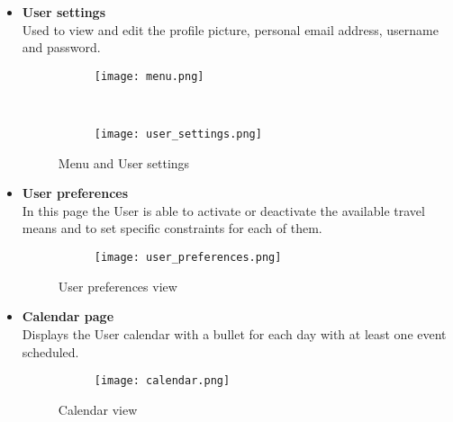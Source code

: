 \begin{itemize}
	\item \textbf{User settings}\\
	Used to view and edit the profile picture, personal email address, username and password.
	\begin{figure}[H]
	\centering
		\begin{subfigure}{0.25\textwidth}
		\centering
		\texttt{[image: menu.png]}
		\end{subfigure}
		~
		\begin{subfigure}{0.25\textwidth}
			\centering
			\texttt{[image: user\_settings.png]}
		\end{subfigure}

	\caption{Menu and User settings}
	\end{figure}

	\item \textbf{User preferences}\\
	In this page the User is able to activate or deactivate the available travel means and to set specific constraints for each of them.
	\begin{figure}[H]
		\centering
		\begin{subfigure}{0.25\textwidth}
			\centering
			\texttt{[image: user\_preferences.png]}
		\end{subfigure}
		\caption{User preferences view}
	\end{figure}
	
	\item \textbf{Calendar page}\\
	Displays the  User calendar with a bullet for each day with at least one event scheduled. 
	\begin{figure}[H]
		\centering
		\begin{subfigure}{0.25\textwidth}
			\centering
			\texttt{[image: calendar.png]}
		\end{subfigure}
		\caption{Calendar view}
	\end{figure}
		


\end{itemize}
